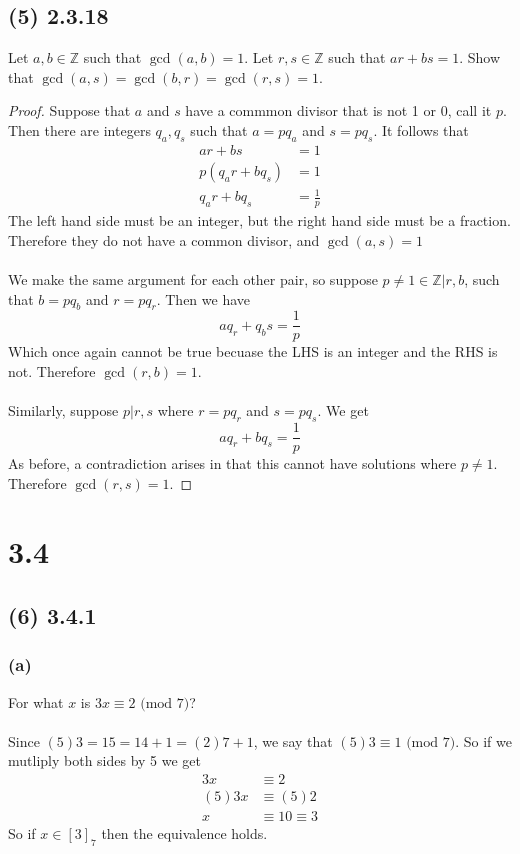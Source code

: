 \documentclass{article}
\begin{document}
\subsection*{(5) 2.3.18}
Let $a,b \in \mathbb{Z}$ such that $\gcd{(a,b) = 1}$.
Let $r, s \in \mathbb{Z}$ such that $ar + bs = 1$.
Show that $\gcd(a,s) = \gcd(b,r) = \gcd(r,s) = 1$.
\begin{proof}
    Suppose that $a$ and $s$ have a commmon divisor that is not 1 or 0, call it $p$.
    Then there are integers $q_a, q_s$ such that $a = pq_a$ and $s = pq_s$.
    It follows that
    \begin{align*}
        ar+bs &=1 \\
        p(q_ar +bq_s) &= 1 \\
        q_ar + bq_s & = \frac{1}{p}
    \end{align*}
    The left hand side must be an integer, but the right hand side must be a fraction.
    Therefore they do not have a common divisor, and $\gcd(a,s) =1$
    \\\\
    We make the same argument for each other pair, so suppose $p \neq 1 \in \mathbb{Z} | r, b$, such that $b = pq_b$ and $r = pq_r$.
    Then we have 
    \[ aq_r + q_bs = \frac{1}{p}\]
    Which once again cannot be true becuase the LHS is an integer and the RHS is not.
    Therefore $\gcd(r, b) = 1$.
    \\\\
    Similarly, suppose $p | r, s$ where $r = pq_r$ and $s = pq_s$.
    We get 
    \[ aq_r + bq_s = \frac{1}{p}\]
    As before, a contradiction arises in that this cannot have solutions where $p \neq 1$.
    Therefore $\gcd(r,s) = 1$.
\end{proof}
\section*{3.4}
\subsection*{(6) 3.4.1}
\subsubsection*{(a)}
For what $x$ is $3x \equiv 2 \text{ (mod 7)}$?
\\\\
Since $(5)3 = 15 = 14 + 1 = (2)7 + 1$, we say that $(5)3 \equiv 1 \text{ (mod 7)}$.
So if we mutliply both sides by 5 we get
\begin{align*}
    3x & \equiv 2 \\
    (5) 3x & \equiv (5) 2 \\
    x & \equiv 10 \equiv 3
\end{align*}
So if $x \in [3]_7$ then the equivalence holds.
\end{document}
